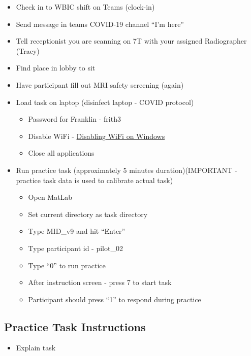 \documentclass[
]{book}
\providecommand{\tightlist}{%
  \setlength{\itemsep}{0pt}\setlength{\parskip}{0pt}}
\begin{document}
\begin{itemize}
\tightlist
\item
  Check in to WBIC shift on Teams (clock-in)
\item
  Send message in teams COVID-19 channel ``I'm here''
\item
  Tell receptionist you are scanning on 7T with your assigned Radiographer (Tracy)
\item
  Find place in lobby to sit
\item
  Have participant fill out MRI safety screening (again)
\item
  Load task on laptop (disinfect laptop - COVID protocol)

  \begin{itemize}
  \tightlist
  \item
    Password for Franklin - frith3
  \item
    Disable WiFi - \protect\hyperlink{disabling-wifi-on-windows}{Disabling WiFi on Windows}
  \item
    Close all applications
  \end{itemize}
\item
  Run practice task (approximately 5 minutes duration)(IMPORTANT - practice task data is used to calibrate actual task)

  \begin{itemize}
  \tightlist
  \item
    Open MatLab
  \item
    Set current directory as task directory
  \item
    Type MID\_v9 and hit ``Enter''
  \item
    Type participant id - pilot\_02
  \item
    Type ``0'' to run practice
  \item
    After instruction screen - press 7 to start task
  \item
    Participant should press ``1'' to respond during practice
  \end{itemize}
\end{itemize}

\hypertarget{practice-task-instructions}{%
\subsection{Practice Task Instructions}\label{practice-task-instructions}}

\begin{itemize}
\tightlist
\item
  Explain task
\end{itemize}
\end{document}
